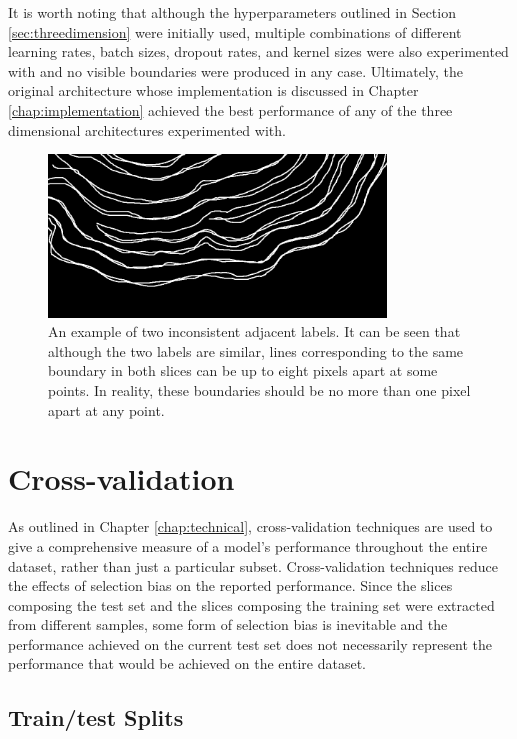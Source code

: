 It is worth noting that although the hyperparameters outlined in Section \ref{sec:threedimension} were initially used, multiple combinations of different learning rates, batch sizes, dropout rates, and kernel sizes were also experimented with and no visible boundaries were produced in any case. Ultimately, the original architecture whose implementation is discussed in Chapter \ref{chap:implementation} achieved the best performance of any of the three dimensional architectures experimented with.

\begin{figure}[t]
    \centering
    \includegraphics[width=0.8\textwidth]{images/3D-label-example.png}
    \caption{An example of two inconsistent adjacent labels. It can be seen that although the two labels are similar, lines corresponding to the same boundary in both slices can be up to eight pixels apart at some points. In reality, these boundaries should be no more than one pixel apart at any point.}
    \label{fig:3dlabel}
\end{figure}

\section{Cross-validation}
\label{sec:evalcrossval}

As outlined in Chapter \ref{chap:technical}, cross-validation techniques are used to give a comprehensive measure of a model's performance throughout the entire dataset, rather than just a particular subset. Cross-validation techniques reduce the effects of selection bias on the reported performance. Since the slices composing the test set and the slices composing the training set were extracted from different samples, some form of selection bias is inevitable and the performance achieved on the current test set does not necessarily represent the performance that would be achieved on the entire dataset.

\subsection{Train/test Splits}

